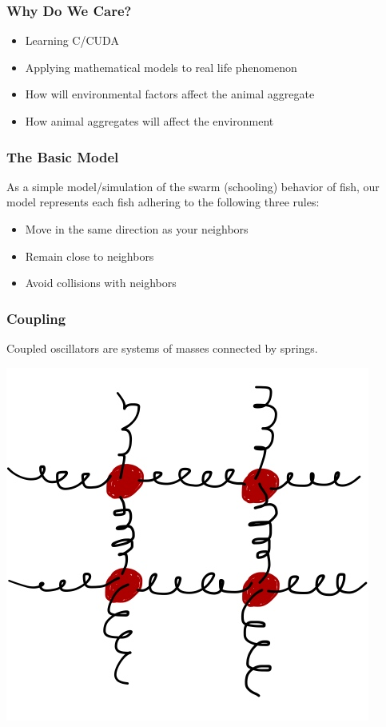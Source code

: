 \documentclass[xcolor=dvipsnames]{beamer}
\begin{document}
\begin{frame}
	\frametitle{Why Do We Care?}
	\begin{itemize}
			\item Learning C/CUDA
			\item Applying mathematical models to real life phenomenon
			\item How will environmental factors affect the animal aggregate
			\item How animal aggregates will affect the environment 
	\end{itemize}
\end{frame}

\begin{frame}
	\frametitle{The Basic Model}
	As a simple model/simulation of the swarm (schooling) behavior of fish, our model represents each fish adhering to the following three rules:
	\pause
	\begin{itemize}
		\item Move in the same direction as your neighbors
			\pause
		\item Remain close to neighbors
			\pause
		\item Avoid collisions with neighbors
	\end{itemize}
\end{frame}

\begin{frame}
	\frametitle{Coupling}
	Coupled oscillators are systems of masses connected by springs.
	\begin{center}
		\includegraphics[scale=0.4]{images/coupled_oscillators}
	\end{center}
\end{frame}
\end{document}
